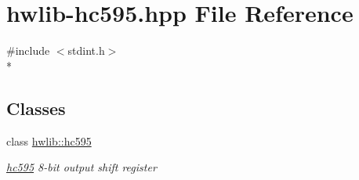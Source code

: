 \hypertarget{hwlib-hc595_8hpp}{}\section{hwlib-\/hc595.hpp File Reference}
\label{hwlib-hc595_8hpp}
{\ttfamily \#include $<$stdint.\+h$>$}\\*
\subsection*{Classes}
\begin{DoxyCompactItemize}
\item 
class \hyperlink{classhwlib_1_1hc595}{hwlib\+::hc595}
\begin{DoxyCompactList}\small\item\em \hyperlink{classhwlib_1_1hc595}{hc595} 8-\/bit output shift register \end{DoxyCompactList}\end{DoxyCompactItemize}

